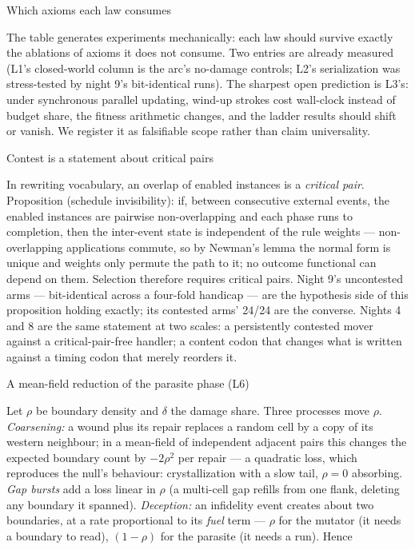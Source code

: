 \secc Which axioms each law consumes

\medskip
\noindent{}
\medskip

\noindent The table generates experiments mechanically: each law
should survive exactly the ablations of axioms it does not
consume. Two entries are already measured (L1's closed-world
column is the arc's no-damage controls; L2's serialization was
stress-tested by night 9's bit-identical runs). The sharpest open
prediction is L3's: under synchronous parallel updating,
wind-up strokes cost wall-clock instead of budget share, the
fitness arithmetic changes, and the ladder results should shift or
vanish. We register it as falsifiable scope
rather than claim universality.

\secc Contest is a statement about critical pairs

In rewriting vocabulary, an overlap of enabled instances is a
{\it critical pair}. Proposition (schedule invisibility): if,
between consecutive external events, the enabled instances are
pairwise non-overlapping and each phase runs to completion, then
the inter-event state is independent of the rule weights ---
non-overlapping applications commute, so by Newman's lemma the
normal form is unique and weights only permute the path to it; no
outcome functional can depend on them. Selection therefore
requires critical pairs. Night 9's uncontested arms ---
bit-identical across a four-fold handicap --- are the hypothesis
side of this proposition holding exactly; its contested arms'
24/24 are the converse. Nights 4 and 8 are the same statement at
two scales: a persistently contested mover against a
critical-pair-free handler; a content codon that changes what is
written against a timing codon that merely reorders it.

\secc A mean-field reduction of the parasite phase (L6)

Let $\rho$ be boundary density and $\delta$ the damage share. Three
processes move $\rho$. {\it Coarsening:} a wound plus its repair
replaces a random cell by a copy of its western neighbour; in a
mean-field of independent adjacent pairs this changes the expected
boundary count by $-2\rho^2$ per repair --- a quadratic loss,
which reproduces the null's behaviour: crystallization with a slow
tail, $\rho=0$ absorbing. {\it Gap bursts} add a loss linear in
$\rho$ (a multi-cell gap refills from one flank, deleting any
boundary it spanned). {\it Deception:} an infidelity event creates
about two boundaries, at a rate proportional to its {\it fuel}
term --- $\rho$ for the mutator (it needs a boundary to read),
$(1-\rho)$ for the parasite (it needs a run). Hence

